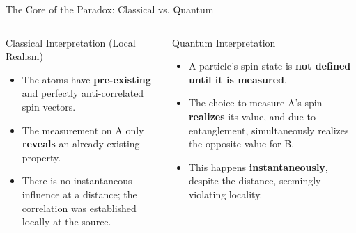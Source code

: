 \begin{frame}{The Core of the Paradox: Classical vs. Quantum}

  \begin{columns}[T]
    \begin{column}{0.5\textwidth}
      \begin{alertblock}{Classical Interpretation (Local Realism)}
        \begin{itemize}[<+->]
          \item The atoms have \textbf{pre-existing} and perfectly anti-correlated spin vectors.
          \item The measurement on A only \textbf{reveals} an already existing property.
          \item There is no instantaneous influence at a distance; the correlation was established locally at the source.
        \end{itemize}
      \end{alertblock}
    \end{column}

    \begin{column}{0.5\textwidth}
      \begin{block}{Quantum Interpretation}
        \begin{itemize}[<+->]
          \item A particle's spin state is \textbf{not defined until it is measured}.
          \item The choice to measure A's spin \textbf{realizes} its value, and due to entanglement, simultaneously realizes the opposite value for B.
          \item This happens \textbf{instantaneously}, despite the distance, seemingly violating locality.
        \end{itemize}
      \end{block}
    \end{column}
  \end{columns}


\end{frame}

